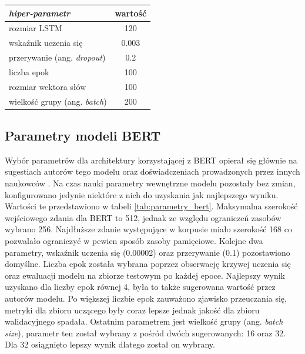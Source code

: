 \begin{table}[t]
\label{tab:parametry_lstm}
\centering\footnotesize%
\begin{tabular}{l c}
\toprule
\textit{hiper-parametr} & wartość \\
\midrule
rozmiar LSTM   & 120 \\
wskaźnik uczenia się   & 0.003 \\
przerywanie (ang. \textit{dropout})   & 0.2 \\
liczba epok   & 100 \\
rozmiar wektora słów   & 100 \\
wielkość grupy (ang. \textit{batch}) & 200 \\
\bottomrule
\end{tabular}
\end{table}

\subsection{Parametry modeli BERT}

Wybór parametrów dla architektury korzystającej z BERT opierał się głównie na sugestiach autorów tego modelu oraz doświadczeniach prowadzonych przez innych naukowców \cite{sun2019finetune}. Na czas nauki parametry wewnętrzne modelu pozostały bez zmian, konfigurowano jedynie niektóre z nich do uzyskania jak najlepszego wyniku. Wartości te przedstawiono w tabeli \ref{tab:parametry_bert}. Maksymalna szerokość wejściowego zdania dla BERT to 512, jednak ze względu ograniczeń zasobów wybrano 256. Najdłuższe zdanie występujące w korpusie miało szerokość 168 co pozwalało ograniczyć w pewien sposób zasoby pamięciowe. Kolejne dwa parametry, wskaźnik uczenia się (0.00002) oraz przerywanie (0.1) pozostawiono domyślne. Liczba epok została wybrana poprzez obserwację krzywej uczenia się oraz ewaluacji modelu na zbiorze testowym po każdej epoce. Najlepszy wynik uzyskano dla liczby epok równej 4, była to także sugerowana wartość przez autorów modelu. Po większej liczbie epok zauważono zjawisko przeuczania się, metryki dla zbioru uczącego były coraz lepsze jednak jakość dla zbioru walidacyjnego spadała. Ostatnim parametrem jest wielkość grupy (ang. \textit{batch size}), parametr ten został wybrany z pośród dwóch sugerowanych: 16 oraz 32. Dla 32 osiągnięto lepszy wynik dlatego został on wybrany.

